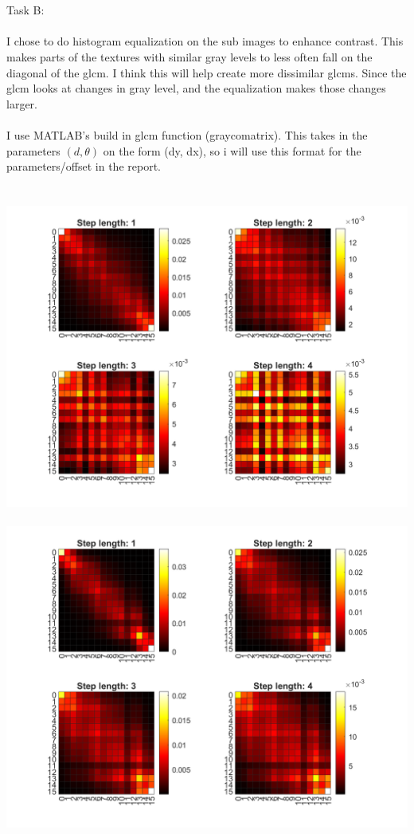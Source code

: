 \documentclass[12pt, letterpaper, twoside]{article}
\begin{document}
\ \\
\ \\
Task B:\\
\ \\
I chose to do histogram equalization on the sub images to enhance contrast. This makes parts of the textures with similar gray levels to less often fall on the diagonal of the glcm. I think this will help create more dissimilar glcms. Since the glcm looks at changes in gray level, and the equalization makes those changes larger.\\
\ \\
I use MATLAB's build in glcm function (graycomatrix). This takes in the parameters $(d, \theta)$ on the form (dy, dx), so i will use this format for the parameters/offset in the report.\\
\ \\
\ \\
\includegraphics[scale=0.4]{"glcm1.png"}
\ \\
\includegraphics[scale=0.4]{"glcm2.png"}
\end{document}
